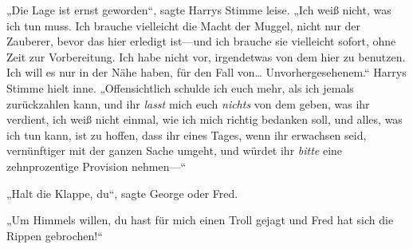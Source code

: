 „Die Lage ist ernst geworden“, sagte Harrys Stimme leise. „Ich weiß nicht, was ich tun muss. Ich brauche vielleicht die Macht der Muggel, nicht nur der Zauberer, bevor das hier erledigt ist—und ich brauche sie vielleicht sofort, ohne Zeit zur Vorbereitung. Ich habe nicht vor, irgendetwas von dem hier zu benutzen. Ich will es nur in der Nähe haben, für den Fall von… Unvorhergesehenem.“
Harrys Stimme hielt inne.
„Offensichtlich schulde ich euch mehr, als ich jemals zurückzahlen kann, und ihr \emph{lasst} mich euch \emph{nichts} von dem geben, was ihr verdient, ich weiß nicht einmal, wie ich mich richtig bedanken soll, und alles, was ich tun kann, ist zu hoffen, dass ihr eines Tages, wenn ihr erwachsen seid, vernünftiger mit der ganzen Sache umgeht, und würdet ihr \emph{bitte} eine zehnprozentige Provision nehmen—“

„Halt die Klappe, du“, sagte George oder Fred.

„Um Himmels willen, du hast für mich einen Troll gejagt und Fred hat sich die Rippen gebrochen!“


